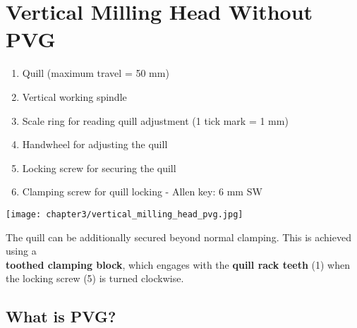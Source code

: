 
\section{Vertical Milling Head Without PVG}

\begin{minipage}{0.5\textwidth}
    \begin{enumerate}[itemsep=1pt,parsep=0pt]
        \item Quill (maximum travel = 50 mm)
        \item Vertical working spindle
        \item Scale ring for reading quill adjustment (1 tick mark = 1 mm)
        \item Handwheel for adjusting the quill
        \item Locking screw for securing the quill
        \item Clamping screw for quill locking - Allen key: 6 mm SW
    \end{enumerate}
\end{minipage}%
\begin{minipage}{0.5\textwidth}
    \centering
    \texttt{[image: chapter3/vertical\_milling\_head\_pvg.jpg]}
\end{minipage}

\vspace{0.5cm}

\noindent The quill can be additionally secured beyond normal clamping.  
This is achieved using a\\ \textbf{toothed clamping block}, which engages with the \textbf{quill rack teeth} (1) when the locking screw (5) is turned clockwise.

\vspace{0.3cm}


\vspace{0.3cm}


\vspace{0.5cm}

\subsection{What is PVG?}

